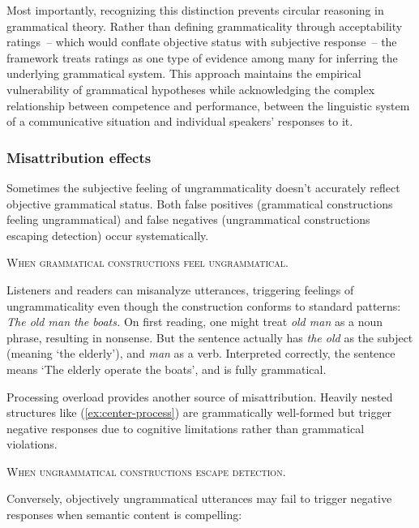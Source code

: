 \documentclass[12pt,letterpaper]{article}
\newcommand{\mention}[1]{\textit{#1}}
\begin{document}
Most importantly, recognizing this distinction prevents circular reasoning in grammatical theory. Rather than defining grammaticality through acceptability ratings~-- which would conflate objective status with subjective response~-- the framework treats ratings as one type of evidence among many for inferring the underlying grammatical system.
 This approach maintains the empirical vulnerability of grammatical hypotheses while acknowledging the complex relationship between competence and performance, between the linguistic system of a communicative situation and individual speakers' responses to it.

\subsubsection{Misattribution effects}\label{sec:misattribution}

Sometimes the subjective feeling of ungrammaticality doesn't accurately reflect objective grammatical status. Both false positives (grammatical constructions feeling ungrammatical) and false negatives (ungrammatical constructions escaping detection) occur systematically.

\textsc{When grammatical constructions feel ungrammatical.}

Listeners and readers can misanalyze utterances, triggering feelings of ungrammaticality even though the construction conforms to standard patterns:
\ea
\mention{The old man the boats.} \autocite{ritchie1984}\label{ex:the-old-mislabel}
\z
On first reading, one might treat \mention{old man} as a noun phrase, resulting in nonsense. But the sentence actually has \mention{the old} as the subject (meaning `the elderly'), and \mention{man} as a verb. Interpreted correctly, the sentence means `The elderly operate the boats', and is fully grammatical.

Processing overload provides another source of misattribution. Heavily nested structures like (\ref{ex:center-process}) are grammatically well-formed but trigger negative responses due to cognitive limitations rather than grammatical violations.

\textsc{When ungrammatical constructions escape detection.}

Conversely, objectively ungrammatical utterances may fail to trigger negative responses when semantic content is compelling:

\label{ex:negative-ads-escape}
\z
\end{document}

